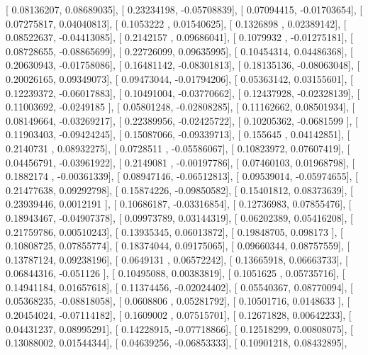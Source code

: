 \documentclass{article}
\begin{document}
       [ 0.08136207,  0.08689035],
       [ 0.23234198, -0.05708839],
       [ 0.07094415, -0.01703654],
       [ 0.07275817,  0.04040813],
       [ 0.1053222 ,  0.01540625],
       [ 0.1326898 ,  0.02389142],
       [ 0.08522637, -0.04413085],
       [ 0.2142157 ,  0.09686041],
       [ 0.1079932 , -0.01275181],
       [ 0.08728655, -0.08865699],
       [ 0.22726099,  0.09635995],
       [ 0.10454314,  0.04486368],
       [ 0.20630943, -0.01758086],
       [ 0.16481142, -0.08301813],
       [ 0.18135136, -0.08063048],
       [ 0.20026165,  0.09349073],
       [ 0.09473044, -0.01794206],
       [ 0.05363142,  0.03155601],
       [ 0.12239372, -0.06017883],
       [ 0.10491004, -0.03770662],
       [ 0.12437928, -0.02328139],
       [ 0.11003692, -0.0249185 ],
       [ 0.05801248, -0.02808285],
       [ 0.11162662,  0.08501934],
       [ 0.08149664, -0.03269217],
       [ 0.22389956, -0.02425722],
       [ 0.10205362, -0.0681599 ],
       [ 0.11903403, -0.09424245],
       [ 0.15087066, -0.09339713],
       [ 0.155645  ,  0.04142851],
       [ 0.2140731 ,  0.08932275],
       [ 0.0728511 , -0.05586067],
       [ 0.10823972,  0.07607419],
       [ 0.04456791, -0.03961922],
       [ 0.2149081 , -0.00197786],
       [ 0.07460103,  0.01968798],
       [ 0.1882174 , -0.00361339],
       [ 0.08947146, -0.06512813],
       [ 0.09539014, -0.05974655],
       [ 0.21477638,  0.09292798],
       [ 0.15874226, -0.09850582],
       [ 0.15401812,  0.08373639],
       [ 0.23939446,  0.0012191 ],
       [ 0.10686187, -0.03316854],
       [ 0.12736983,  0.07855476],
       [ 0.18943467, -0.04907378],
       [ 0.09973789,  0.03144319],
       [ 0.06202389,  0.05416208],
       [ 0.21759786,  0.00510243],
       [ 0.13935345,  0.06013872],
       [ 0.19848705,  0.098173  ],
       [ 0.10808725,  0.07855774],
       [ 0.18374044,  0.09175065],
       [ 0.09660344,  0.08757559],
       [ 0.13787124,  0.09238196],
       [ 0.0649131 ,  0.06572242],
       [ 0.13665918,  0.06663733],
       [ 0.06844316, -0.051126  ],
       [ 0.10495088,  0.00383819],
       [ 0.1051625 ,  0.05735716],
       [ 0.14941184,  0.01657618],
       [ 0.11374456, -0.02024402],
       [ 0.05540367,  0.08770094],
       [ 0.05368235, -0.08818058],
       [ 0.0608806 ,  0.05281792],
       [ 0.10501716,  0.0148633 ],
       [ 0.20454024, -0.07114182],
       [ 0.1609002 ,  0.07515701],
       [ 0.12671828,  0.00642233],
       [ 0.04431237,  0.08995291],
       [ 0.14228915, -0.07718866],
       [ 0.12518299,  0.00808075],
       [ 0.13088002,  0.01544344],
       [ 0.04639256, -0.06853333],
       [ 0.10901218,  0.08432895],
\end{document}
